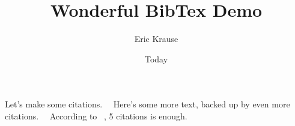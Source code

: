 \documentclass{article}
\begin{document}
\title{Wonderful BibTex Demo}
\author{Eric Krause}
\date{Today}
\maketitle
Let's make some citations.~\cite{Nobody06}~\cite{Meyer2000}  Here's some more text, backed up by even more citations.~\cite{Codishetal2000}~\cite{Huetal2000}  According to ~\cite{Conway2000}, 5 citations is enough.



\end{document}
